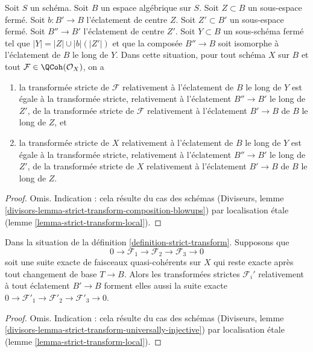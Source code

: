 \begin{lemma}
\label{lemma-strict-transform-composition-blowups}
Soit $S$ un schéma. Soit $B$ un espace algébrique sur $S$.
Soit $Z \subset B$ un sous-espace fermé.
Soit $b : B' \to B$ l'éclatement de centre $Z$.
Soit $Z' \subset B'$ un sous-espace fermé.
Soit $B'' \to B'$ l'éclatement de centre $Z'$.
Soit $Y \subset B$ un sous-schéma fermé tel que
$|Y| = |Z| \cup |b|(|Z'|)$ et que la composée $B'' \to B$
soit isomorphe à l'éclatement de $B$ le long de $Y$.
Dans cette situation, pour tout schéma $X$ sur $B$ et tout
$\mathcal{F} \in \QCoh(\mathcal{O}_X)$, on a
\begin{enumerate}
\item la transformée stricte de $\mathcal{F}$ relativement à l'éclatement
de $B$ le long de $Y$ est égale à la transformée stricte, relativement à
l'éclatement $B'' \to B'$ le long de $Z'$, de la transformée stricte de $\mathcal{F}$
relativement à l'éclatement $B' \to B$ de $B$ le long de $Z$, et
\item la transformée stricte de $X$ relativement à l'éclatement
de $B$ le long de $Y$ est égale à la transformée stricte, relativement à
l'éclatement $B'' \to B'$ le long de $Z'$, de la transformée stricte de $X$
relativement à l'éclatement $B' \to B$ de $B$ le long de $Z$.
\end{enumerate}
\end{lemma}

\begin{proof}
Omis. Indication : cela résulte du cas des schémas
(Diviseurs, lemme \ref{divisors-lemma-strict-transform-composition-blowups})
par localisation étale (lemme \ref{lemma-strict-transform-local}).
\end{proof}

\begin{lemma}
\label{lemma-strict-transform-universally-injective}
Dans la situation de la définition \ref{definition-strict-transform}.
Supposons que
$$
0 \to \mathcal{F}_1 \to \mathcal{F}_2 \to \mathcal{F}_3 \to 0
$$
soit une suite exacte de faisceaux quasi-cohérents sur $X$ qui reste
exacte après tout changement de base $T \to B$. Alors les transformées strictes
$\mathcal{F}_i'$ relativement à tout éclatement $B' \to B$
forment elles aussi la suite exacte
$0 \to \mathcal{F}'_1 \to \mathcal{F}'_2 \to \mathcal{F}'_3 \to 0$.
\end{lemma}

\begin{proof}
Omis. Indication : cela résulte du cas des schémas
(Diviseurs, lemme \ref{divisors-lemma-strict-transform-universally-injective})
par localisation étale (lemme \ref{lemma-strict-transform-local}).
\end{proof}


